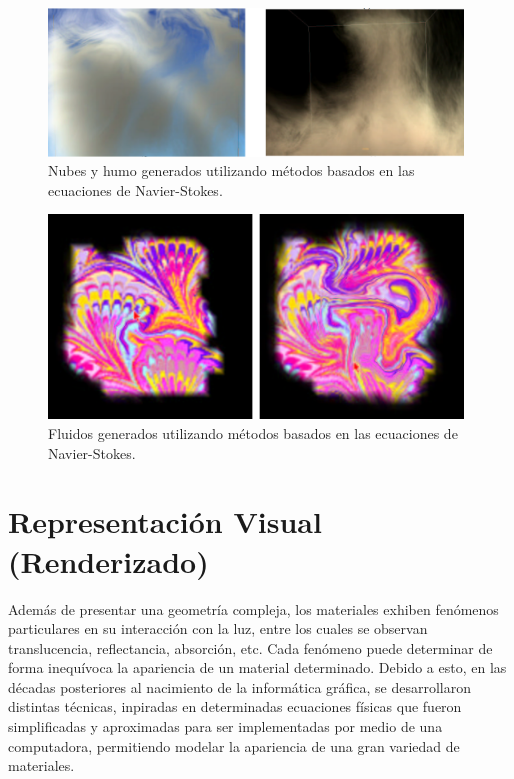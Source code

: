 \begin{figure}
\center
\includegraphics[width=11cm]{figures/fluidos1}
\caption{Nubes y humo generados utilizando métodos basados en las ecuaciones de Navier-Stokes.}
\label{fg:fluidos1}
\end{figure}

\begin{figure}
\center
\includegraphics[width=11cm]{figures/fluidos2}
\caption{Fluidos generados utilizando métodos basados en las ecuaciones de Navier-Stokes.}
\label{fg:fluidos2}
\end{figure}


\section{Representación Visual (Renderizado)}

Además de presentar una geometría compleja, los materiales exhiben fenómenos particulares en su interacción con la luz, entre los cuales se observan translucencia, reflectancia, absorción, etc.
Cada fenómeno puede determinar de forma inequívoca la apariencia de un material determinado.
Debido a esto, en las décadas posteriores al nacimiento de la informática gráfica, se desarrollaron distintas técnicas, inpiradas en determinadas ecuaciones físicas que fueron simplificadas y aproximadas para ser implementadas por medio de una computadora, permitiendo modelar la apariencia de una gran variedad de materiales.

